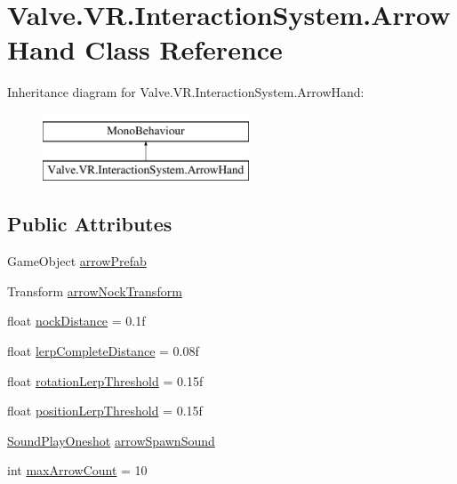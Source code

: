 \hypertarget{class_valve_1_1_v_r_1_1_interaction_system_1_1_arrow_hand}{}\section{Valve.\+V\+R.\+Interaction\+System.\+Arrow\+Hand Class Reference}
\label{class_valve_1_1_v_r_1_1_interaction_system_1_1_arrow_hand}
Inheritance diagram for Valve.\+V\+R.\+Interaction\+System.\+Arrow\+Hand\+:\begin{figure}[H]
\begin{center}
\leavevmode
\includegraphics[height=2.000000cm]{class_valve_1_1_v_r_1_1_interaction_system_1_1_arrow_hand}
\end{center}
\end{figure}
\subsection*{Public Attributes}
\begin{DoxyCompactItemize}
\item 
Game\+Object \mbox{\hyperlink{class_valve_1_1_v_r_1_1_interaction_system_1_1_arrow_hand_a25901b629ca2b817de503b98f696aab9}{arrow\+Prefab}}
\item 
Transform \mbox{\hyperlink{class_valve_1_1_v_r_1_1_interaction_system_1_1_arrow_hand_a14683ec3df3b0d154dd3f08801825060}{arrow\+Nock\+Transform}}
\item 
float \mbox{\hyperlink{class_valve_1_1_v_r_1_1_interaction_system_1_1_arrow_hand_a081821aeedbf4d2aeb868f0baa252d00}{nock\+Distance}} = 0.\+1f
\item 
float \mbox{\hyperlink{class_valve_1_1_v_r_1_1_interaction_system_1_1_arrow_hand_a058123659a580ef9a460d9ed576eae99}{lerp\+Complete\+Distance}} = 0.\+08f
\item 
float \mbox{\hyperlink{class_valve_1_1_v_r_1_1_interaction_system_1_1_arrow_hand_a196de8b1ec4f79ba4f429b04e68409f9}{rotation\+Lerp\+Threshold}} = 0.\+15f
\item 
float \mbox{\hyperlink{class_valve_1_1_v_r_1_1_interaction_system_1_1_arrow_hand_ade30be6b85b696d644ab2250a7ea12c6}{position\+Lerp\+Threshold}} = 0.\+15f
\item 
\mbox{\hyperlink{class_valve_1_1_v_r_1_1_interaction_system_1_1_sound_play_oneshot}{Sound\+Play\+Oneshot}} \mbox{\hyperlink{class_valve_1_1_v_r_1_1_interaction_system_1_1_arrow_hand_aaf9325ee478d746598cf0500de63bb39}{arrow\+Spawn\+Sound}}
\item 
int \mbox{\hyperlink{class_valve_1_1_v_r_1_1_interaction_system_1_1_arrow_hand_a546cfd0a16a1f6b3d05596b1b3a9fc2f}{max\+Arrow\+Count}} = 10
\end{DoxyCompactItemize}


